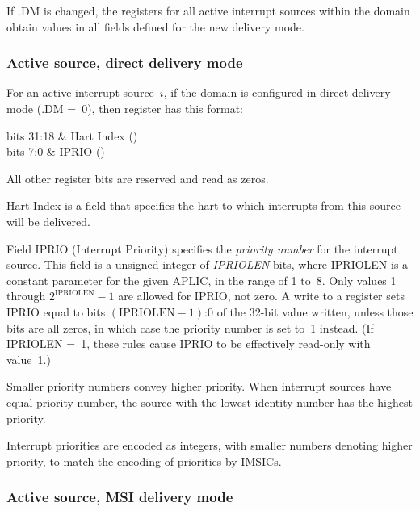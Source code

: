 If .DM is changed, the  registers
for all active interrupt sources within the domain obtain
{\unspecified} values in all fields defined for the new delivery mode.

\subsubsection*{Active source, direct delivery mode}

For an active interrupt source~$i$, if the domain is configured
in direct delivery mode (.DM =~0), then register
 has this format:\nopagebreak
\begin{displayLinesTable}[l@{\ \quad}l]
bits 31:18 & Hart Index (\WLRL) \\
bits 7:0   & IPRIO (\WARL) \\
\end{displayLinesTable}
All other register bits are reserved and read as zeros.

Hart Index is a {\WLRL} field that specifies the hart to which
interrupts from this source will be delivered.

Field IPRIO (Interrupt Priority) specifies the \emph{priority number}
for the interrupt source.
This field is a {\WARL} unsigned integer of \emph{IPRIOLEN} bits, where
IPRIOLEN is a constant parameter for the given APLIC, in the range of
1 to~8.
Only values 1 through $\mbox{2}^{\textrm{IPRIOLEN}} - \mbox{1}$ are
allowed for IPRIO, not zero.
A write to a  register sets IPRIO equal to bits
$({\mbox{IPRIOLEN} - \mbox{1}})$:0 of the \mbox{32-bit} value written,
unless those bits are all zeros, in which case the priority number is
set to~1 instead.
(If IPRIOLEN =~1, these rules cause IPRIO to be effectively read-only
with value~1.)

Smaller priority numbers convey higher priority.
When interrupt sources have equal priority number, the source with the
lowest identity number has the highest priority.

\begin{commentary}
Interrupt priorities are encoded as integers, with smaller numbers
denoting higher priority, to match the encoding of priorities by
IMSICs.
\end{commentary}

\subsubsection*{Active source, MSI delivery mode}

